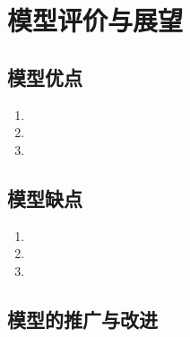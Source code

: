 \section{模型评价与展望}

\subsection{模型优点}

\begin{enumerate}
  \item %
  \item %
  \item %
\end{enumerate}

\subsection{模型缺点}

\begin{enumerate}
  \item %
  \item %
  \item %
\end{enumerate}

\subsection{模型的推广与改进}


